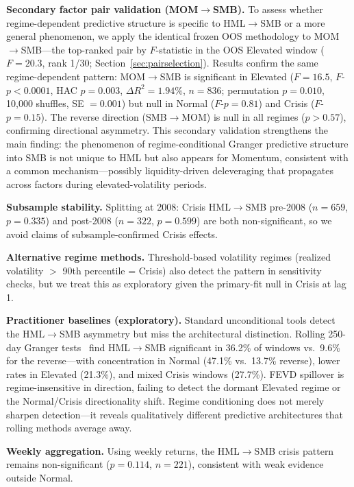 \documentclass[sigconf,anonymous]{acmart}
\begin{document}
\textbf{Secondary factor pair validation (MOM$\to$SMB).}
To assess whether regime-dependent predictive structure is specific to HML$\to$SMB or a
more general phenomenon, we apply the identical frozen OOS methodology to MOM$\to$SMB---the
top-ranked pair by $F$-statistic in the OOS Elevated window ($F = 20.3$, rank 1/30;
Section~\ref{sec:pairselection}).
Results confirm the same regime-dependent pattern:
MOM$\to$SMB is significant in Elevated ($F = 16.5$, $F$-$p < 0.0001$, HAC $p = 0.003$,
$\Delta R^2 = 1.94\%$, $n = 836$; permutation $p = 0.010$, 10{,}000 shuffles, SE $= 0.001$)
but null in Normal ($F$-$p = 0.81$) and Crisis ($F$-$p = 0.15$).
The reverse direction (SMB$\to$MOM) is null in all regimes ($p > 0.57$), confirming
directional asymmetry.
This secondary validation strengthens the main finding: the phenomenon of
regime-conditional Granger predictive structure into SMB is not unique to HML but also
appears for Momentum, consistent with a common mechanism---possibly liquidity-driven
deleveraging that propagates across factors during elevated-volatility periods.

\textbf{Subsample stability.} Splitting at 2008: Crisis HML$\to$SMB
pre-2008 ($n = 659$, $p = 0.335$) and post-2008 ($n = 322$, $p = 0.599$)
are both non-significant, so we avoid claims of subsample-confirmed Crisis effects.

\textbf{Alternative regime methods.} Threshold-based volatility regimes
(realized volatility $>$ 90th percentile = Crisis) also detect the pattern
in sensitivity checks, but we treat this as exploratory given the primary-fit
null in Crisis at lag 1.

\textbf{Practitioner baselines (exploratory).} Standard unconditional tools detect the HML$\to$SMB
asymmetry but miss the architectural distinction. Rolling 250-day Granger tests~\cite{baum2022timevarying}
find HML$\to$SMB significant in 36.2\% of windows vs.\ 9.6\% for the
reverse---with concentration in Normal (47.1\% vs.\ 13.7\% reverse),
lower rates in Elevated (21.3\%), and mixed Crisis windows (27.7\%).
FEVD spillover is regime-insensitive in direction,
failing to detect the dormant Elevated regime or the Normal/Crisis directionality
shift. Regime conditioning does not merely sharpen detection---it reveals
qualitatively different predictive architectures that rolling methods average away.

\textbf{Weekly aggregation.} Using weekly returns, the HML$\to$SMB crisis pattern
remains non-significant ($p = 0.114$, $n = 221$), consistent with weak
evidence outside Normal.
\end{document}
